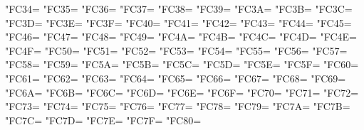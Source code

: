 \XeTeXcharclass"FC34=\KclassArabU
\XeTeXcharclass"FC35=\KclassArabU
\XeTeXcharclass"FC36=\KclassArabU
\XeTeXcharclass"FC37=\KclassArabU
\XeTeXcharclass"FC38=\KclassArabU
\XeTeXcharclass"FC39=\KclassArabU
\XeTeXcharclass"FC3A=\KclassArabU
\XeTeXcharclass"FC3B=\KclassArabU
\XeTeXcharclass"FC3C=\KclassArabU
\XeTeXcharclass"FC3D=\KclassArabU
\XeTeXcharclass"FC3E=\KclassArabU
\XeTeXcharclass"FC3F=\KclassArabU
\XeTeXcharclass"FC40=\KclassArabU
\XeTeXcharclass"FC41=\KclassArabU
\XeTeXcharclass"FC42=\KclassArabU
\XeTeXcharclass"FC43=\KclassArabU
\XeTeXcharclass"FC44=\KclassArabU
\XeTeXcharclass"FC45=\KclassArabU
\XeTeXcharclass"FC46=\KclassArabU
\XeTeXcharclass"FC47=\KclassArabU
\XeTeXcharclass"FC48=\KclassArabU
\XeTeXcharclass"FC49=\KclassArabU
\XeTeXcharclass"FC4A=\KclassArabU
\XeTeXcharclass"FC4B=\KclassArabU
\XeTeXcharclass"FC4C=\KclassArabU
\XeTeXcharclass"FC4D=\KclassArabU
\XeTeXcharclass"FC4E=\KclassArabU
\XeTeXcharclass"FC4F=\KclassArabU
\XeTeXcharclass"FC50=\KclassArabU
\XeTeXcharclass"FC51=\KclassArabU
\XeTeXcharclass"FC52=\KclassArabU
\XeTeXcharclass"FC53=\KclassArabU
\XeTeXcharclass"FC54=\KclassArabU
\XeTeXcharclass"FC55=\KclassArabU
\XeTeXcharclass"FC56=\KclassArabU
\XeTeXcharclass"FC57=\KclassArabU
\XeTeXcharclass"FC58=\KclassArabU
\XeTeXcharclass"FC59=\KclassArabU
\XeTeXcharclass"FC5A=\KclassArabU
\XeTeXcharclass"FC5B=\KclassArabU
\XeTeXcharclass"FC5C=\KclassArabU
\XeTeXcharclass"FC5D=\KclassArabU
\XeTeXcharclass"FC5E=\KclassArabU
\XeTeXcharclass"FC5F=\KclassArabU
\XeTeXcharclass"FC60=\KclassArabU
\XeTeXcharclass"FC61=\KclassArabU
\XeTeXcharclass"FC62=\KclassArabU
\XeTeXcharclass"FC63=\KclassArabU
\XeTeXcharclass"FC64=\KclassArabU
\XeTeXcharclass"FC65=\KclassArabU
\XeTeXcharclass"FC66=\KclassArabU
\XeTeXcharclass"FC67=\KclassArabU
\XeTeXcharclass"FC68=\KclassArabU
\XeTeXcharclass"FC69=\KclassArabU
\XeTeXcharclass"FC6A=\KclassArabU
\XeTeXcharclass"FC6B=\KclassArabU
\XeTeXcharclass"FC6C=\KclassArabU
\XeTeXcharclass"FC6D=\KclassArabU
\XeTeXcharclass"FC6E=\KclassArabU
\XeTeXcharclass"FC6F=\KclassArabU
\XeTeXcharclass"FC70=\KclassArabU
\XeTeXcharclass"FC71=\KclassArabU
\XeTeXcharclass"FC72=\KclassArabU
\XeTeXcharclass"FC73=\KclassArabU
\XeTeXcharclass"FC74=\KclassArabU
\XeTeXcharclass"FC75=\KclassArabU
\XeTeXcharclass"FC76=\KclassArabU
\XeTeXcharclass"FC77=\KclassArabU
\XeTeXcharclass"FC78=\KclassArabU
\XeTeXcharclass"FC79=\KclassArabU
\XeTeXcharclass"FC7A=\KclassArabU
\XeTeXcharclass"FC7B=\KclassArabU
\XeTeXcharclass"FC7C=\KclassArabU
\XeTeXcharclass"FC7D=\KclassArabU
\XeTeXcharclass"FC7E=\KclassArabU
\XeTeXcharclass"FC7F=\KclassArabU
\XeTeXcharclass"FC80=\KclassArabU
